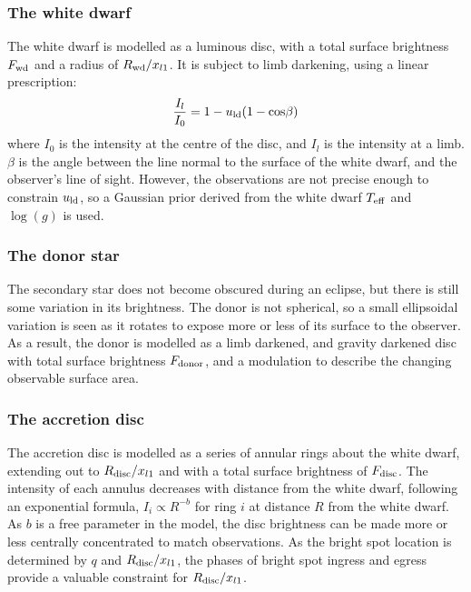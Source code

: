 \subsubsection{The white dwarf}

The white dwarf is modelled as a luminous disc, with a total surface brightness $F_{\rm wd}$ and a radius of $R_{\rm wd} / x_{l1}$. It is subject to limb darkening, using a linear prescription:
\begin{equation}
    \frac{I_l}{I_0} = 1 - u_{\rm ld}(1 - {\rm cos}\beta)
\end{equation}
where $I_0$ is the intensity at the centre of the disc, and $I_l$ is the intensity at a limb. $\beta$ is the angle between the line normal to the surface of the white dwarf, and the observer's line of sight.
However, the observations are not precise enough to constrain $u_{\rm ld}$, so a Gaussian prior derived from the white dwarf $T_{\rm eff}$ and $\log(g)$ is used.

\subsubsection{The donor star}

The secondary star does not become obscured during an eclipse, but there is still some variation in its brightness. The donor is not spherical, so a small ellipsoidal variation is seen as it rotates to expose more or less of its surface to the observer. As a result, the donor is modelled as a limb darkened, and gravity darkened disc with total surface brightness $F_{\rm donor}$, and a modulation to describe the changing observable surface area.

\subsubsection{The accretion disc}

The accretion disc is modelled as a series of annular rings about the white dwarf, extending out to $R_{\rm disc} / x_{l1}$ and with a total surface brightness of $F_{\rm disc}$. The intensity of each annulus decreases with distance from the white dwarf, following an exponential formula, $I_i \propto R^{-b}$ for ring $i$ at distance $R$ from the white dwarf. As $b$ is a free parameter in the model, the disc brightness can be made more or less centrally concentrated to match observations. As the bright spot location is determined by $q$ and $R_{\rm disc} / x_{l1}$, the phases of bright spot ingress and egress provide a valuable constraint for $R_{\rm disc} / x_{l1}$.

